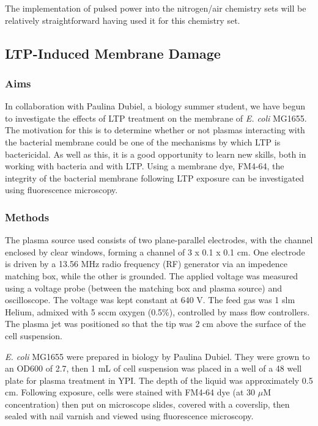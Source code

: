 \documentclass[11pt, oneside]{article}   	%
\begin{document}
The implementation of pulsed power into the nitrogen/air chemistry sets will be relatively straightforward having used it for this chemistry set.

\subsection{LTP-Induced Membrane Damage}

\subsubsection{Aims}
In collaboration with Paulina Dubiel, a biology summer student, we have begun to investigate the effects of LTP treatment on the membrane of \textit{E. coli} MG1655.
The motivation for this is to determine whether or not plasmas interacting with the bacterial membrane could be one of the mechanisms by which LTP is bactericidal.
As well as this, it is a good opportunity to learn new skills, both in working with bacteria and with LTP.
Using a membrane dye, FM4-64, the integrity of the bacterial membrane following LTP exposure can be investigated using fluorescence microscopy.


\subsubsection{Methods}

The plasma source used consists of two plane-parallel electrodes, with the channel enclosed by clear windows, forming a channel of 3 x 0.1 x 0.1 cm. 
One electrode is driven by a 13.56 MHz radio frequency (RF) generator via an impedence matching box, while the other is grounded. 
The applied voltage was measured using a voltage probe (between the matching box and plasma source) and oscilloscope.
The voltage was kept constant at 640 V.
The feed gas was 1 slm Helium, admixed with 5 sccm oxygen (0.5\%), controlled by mass flow controllers. 
The plasma jet was positioned so that the tip was 2 cm above the surface of the cell suspension.

\textit{E. coli} MG1655 were prepared in biology by Paulina Dubiel. 
They were grown to an OD600 of 2.7, then 1 mL of cell suspension was placed in a well of a 48 well plate for plasma treatment in YPI.
The depth of the liquid was approximately 0.5 cm.
Following exposure, cells were stained with FM4-64 dye (at 30 $\mu$M concentration) then put on microscope slides, covered with a coverslip, then sealed with nail varnish and viewed using fluorescence microscopy.
\end{document}
